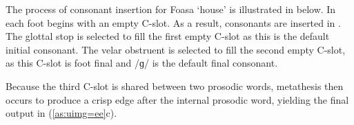 \begin{exe}
\let\eachwordone=\textnormal
	\label{ex:KorJeen}
\end{exe}

The process of consonant insertion for Fo{\Q}asa{\Q}
 {\ra}  `house' is illustrated in  below.
In  each foot begins with an empty C-slot.
As a result, consonants are inserted in .
The glottal stop is selected to fill the first empty C-slot
as this is the default initial consonant.
The velar obstruent is selected to fill the second
empty C-slot, as this C-slot is foot final
and /ɡ/ is the default final consonant.

Because the third C-slot is shared between two prosodic
words, metathesis then occurs to produce
a crisp edge after the internal prosodic word,
yielding the final output in (\ref{as:uimg=ee}c).

